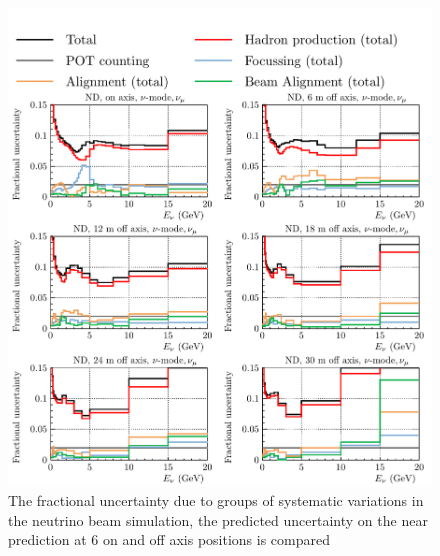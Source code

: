 \documentclass{article}
\begin{document}
\begin{figure}
  \centering
  \includegraphics[width=\textwidth]{plots/fracerrs/numode_numu_ErrType_OffAxis}
  \caption{The fractional uncertainty due to groups of systematic variations in the neutrino beam simulation, the predicted uncertainty on the near prediction at 6 on and off axis positions is compared }
  \label{fig:grp_nu_numu_offaxis}
\end{figure}
\end{document}
